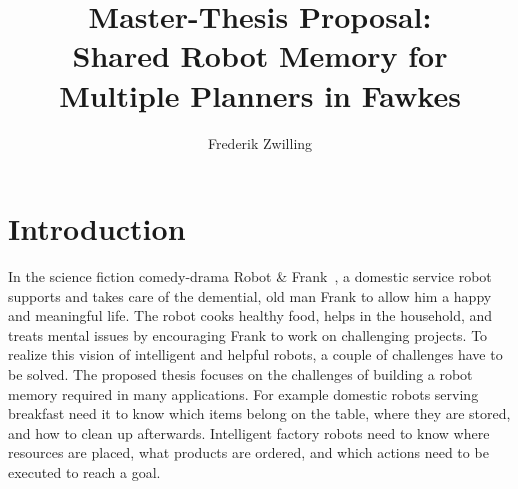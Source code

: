 \documentclass[a4paper,11pt]{article}
\author{Frederik Zwilling}
\title{Master-Thesis Proposal:\\ Shared Robot Memory for Multiple Planners in Fawkes}
\begin{document}
\maketitle

\section{Introduction}
\label{sec:introduction}

In the science fiction comedy-drama Robot \&
Frank~\cite{robot-and-frank}, a domestic service robot supports and
takes care of the demential, old man Frank to allow him a happy and
meaningful life. The robot cooks healthy food, helps in the household,
and treats mental issues by encouraging Frank to work on challenging
projects. To realize this vision of intelligent and helpful robots, a
couple of challenges have to be solved. The proposed thesis focuses on
the challenges of building a robot memory required in many
applications. For example domestic robots serving breakfast need it to
know which items belong on the table, where they are stored, and how
to clean up afterwards. Intelligent factory robots need to know where
resources are placed, what products are ordered, and which actions
need to be executed to reach a goal.
\end{document}
